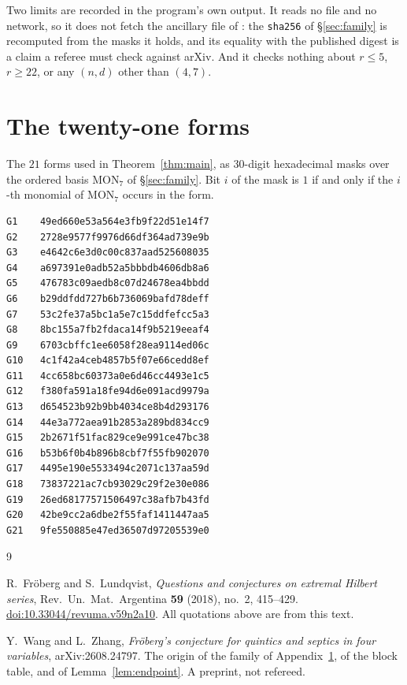 \documentclass[11pt]{amsart}
\theoremstyle{remark}
\begin{document}
Two limits are recorded in the program's own output. It reads no file and no
network, so it does not fetch the ancillary file of \cite{WZ}: the
\texttt{sha256} of \S\ref{sec:family} is recomputed from the masks it holds, and
its equality with the published digest is a claim a referee must check against
arXiv. And it checks nothing about $r\le5$, $r\ge22$, or any $(n,d)$ other than
$(4,7)$.

\appendix

\section{The twenty-one forms}\label{app:family}

The $21$ forms used in Theorem~\ref{thm:main}, as $30$-digit hexadecimal masks
over the ordered basis $\mathrm{MON}_7$ of \S\ref{sec:family}. Bit $i$ of the
mask is $1$ if and only if the $i$-th monomial of $\mathrm{MON}_7$ occurs in the
form.

{\scriptsize\begin{verbatim}
G1    49ed660e53a564e3fb9f22d51e14f7
G2    2728e9577f9976d66df364ad739e9b
G3    e4642c6e3d0c00c837aad525608035
G4    a697391e0adb52a5bbbdb4606db8a6
G5    476783c09aedb8c07d24678ea4bbdd
G6    b29ddfdd727b6b736069bafd78deff
G7    53c2fe37a5bc1a5e7c15ddfefcc5a3
G8    8bc155a7fb2fdaca14f9b5219eeaf4
G9    6703cbffc1ee6058f28ea9114ed06c
G10   4c1f42a4ceb4857b5f07e66cedd8ef
G11   4cc658bc60373a0e6d46cc4493e1c5
G12   f380fa591a18fe94d6e091acd9979a
G13   d654523b92b9bb4034ce8b4d293176
G14   44e3a772aea91b2853a289bd834cc9
G15   2b2671f51fac829ce9e991ce47bc38
G16   b53b6f0b4b896b8cbf7f55fb902070
G17   4495e190e5533494c2071c137aa59d
G18   73837221ac7cb93029c29f2e30e086
G19   26ed68177571506497c38afb7b43fd
G20   42be9cc2a6dbe2f55faf1411447aa5
G21   9fe550885e47ed36507d97205539e0
\end{verbatim}}

\begin{thebibliography}{9}

R.~Fr\"oberg and S.~Lundqvist,
\emph{Questions and conjectures on extremal Hilbert series},
Rev.\ Un.\ Mat.\ Argentina \textbf{59} (2018), no.~2, 415--429.
\href{https://doi.org/10.33044/revuma.v59n2a10}{doi:10.33044/revuma.v59n2a10}.
All quotations above are from this text.

Y.~Wang and L.~Zhang,
\emph{Fr\"oberg's conjecture for quintics and septics in four variables},
arXiv:2608.24797.
The origin of the family of Appendix~\ref{app:family}, of the block table, and
of Lemma~\ref{lem:endpoint}. A preprint, not refereed.

\end{thebibliography}
\end{document}

